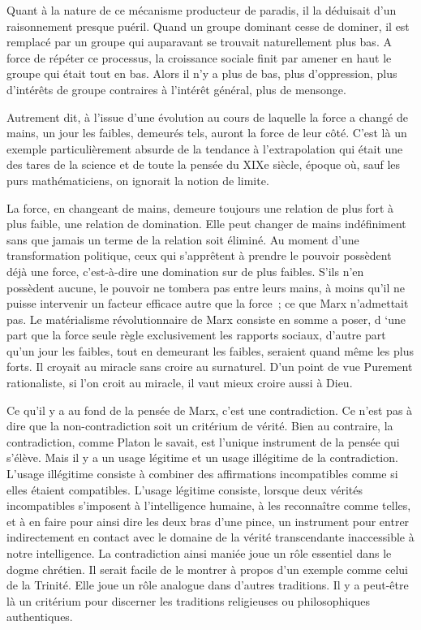 \documentclass[french,twoside]{book} %
\begin{document}
Quant à la nature de ce mécanisme producteur de paradis, il la déduisait d'un raisonnement presque puéril. Quand un groupe dominant cesse de dominer, il est remplacé par un groupe qui auparavant se trouvait naturellement plus bas. A force de répéter ce processus, la croissance sociale finit par amener en haut le groupe qui était tout en bas. Alors il n'y a plus de bas, plus d'oppression, plus d'intérêts de groupe contraires à l'intérêt général, plus de mensonge.\par
Autrement dit, à l'issue d'une évolution au cours de laquelle la force a changé de mains, un jour les faibles, demeurés tels, auront la force de leur côté. C'est là un exemple particulièrement absurde de la tendance à l'extrapolation qui était une des tares de la science et de toute la pensée du XIXe siècle, époque où, sauf les purs mathématiciens, on ignorait la notion de limite.\par
La force, en changeant de mains, demeure toujours une relation de plus fort à plus faible, une relation de domination. Elle peut changer de mains indéfiniment sans que jamais un terme de la relation soit éliminé. Au moment d'une transformation politique, ceux qui s'apprêtent à prendre le pouvoir possèdent déjà une force, c'est-à-dire une domination sur de plus faibles. S'ils n'en possèdent aucune, le pouvoir ne tombera pas entre leurs mains, à moins qu'il ne puisse intervenir un facteur efficace autre que la force ; ce que Marx n'admettait pas. Le matérialisme révolutionnaire de Marx consiste en somme a poser, d ‘une part que la force seule règle exclusivement les rapports sociaux, d'autre part qu'un jour les faibles, tout en demeurant les faibles, seraient quand même les plus forts. Il croyait au miracle sans croire au surnaturel. D'un point de vue Purement rationaliste, si l'on croit au miracle, il vaut mieux croire aussi à Dieu.\par
Ce qu'il y a au fond de la pensée de Marx, c'est une contradiction. Ce n'est pas à dire que la non-contradiction soit un critérium de vérité. Bien au contraire, la contradiction, comme Platon le savait, est l'unique instrument de la pensée qui s'élève. Mais il y a un usage légitime et un usage illégitime de la contradiction. L'usage illégitime consiste à combiner des affirmations incompatibles comme si elles étaient compatibles. L'usage légitime consiste, lorsque deux vérités incompatibles s'imposent à l'intelligence humaine, à les reconnaître comme telles, et à en faire pour ainsi dire les deux bras d'une pince, un instrument pour entrer indirectement en contact avec le domaine de la vérité transcendante inaccessible à notre intelligence. La contradiction ainsi maniée joue un rôle essentiel dans le dogme chrétien. Il serait facile de le montrer à propos d'un exemple comme celui de la Trinité. Elle joue un rôle analogue dans d'autres traditions. Il y a peut-être là un critérium pour discerner les traditions religieuses ou philosophiques authentiques.\par
\end{document}
